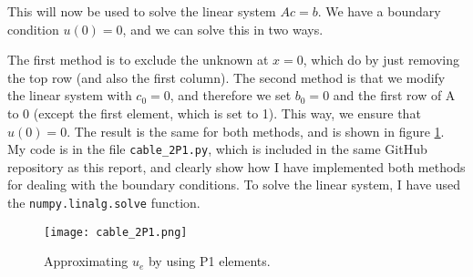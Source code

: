 \documentclass[10pt, a4paper]{amsart}
\numberwithin{figure}{section}
\numberwithin{table}{section}
\begin{document}
This will now be used to solve the linear system $Ac = b$. We have a boundary
condition $u(0) = 0$, and we can solve this in two ways. 

The first method is to exclude the unknown at $x=0$, which do by just removing
the top row (and also the first column). The second method is that we modify the linear system with
$c_0 = 0$, and therefore we set $b_0 = 0$ and the first row of A to 0 (except
the first element, which is set to 1). This way, we ensure that $u(0)=0$. The
result is the same for both methods, and is shown in figure \ref{fig:cable_2P1}. 
My code is in the file \texttt{cable\_2P1.py}, which is included in the same GitHub repository as this
report, and clearly show how I have implemented both methods for dealing with
the boundary conditions. To solve the linear system, I have used the \texttt{numpy.linalg.solve}
function.

\begin{figure}
       \texttt{[image: cable\_2P1.png]}
       \caption{Approximating $u_e$ by using P1 elements.}
       \label{fig:cable_2P1}
\end{figure}

\end{document}

